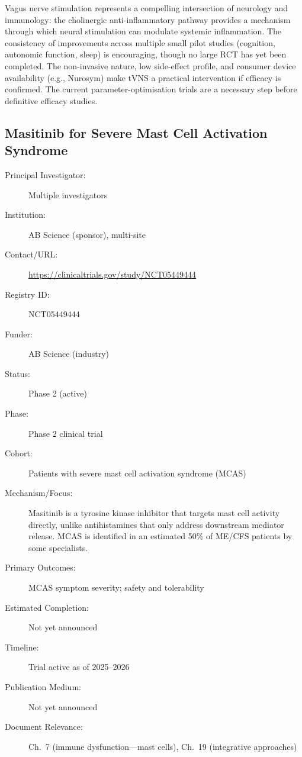 Vagus nerve stimulation represents a compelling intersection of neurology and
immunology: the cholinergic anti-inflammatory pathway provides a mechanism
through which neural stimulation can modulate systemic inflammation.  The
consistency of improvements across multiple small pilot studies (cognition,
autonomic function, sleep) is encouraging, though no large RCT has yet been
completed.  The non-invasive nature, low side-effect profile, and consumer
device availability (e.g., Nurosym) make tVNS a practical intervention if
efficacy is confirmed.  The current parameter-optimisation trials are a
necessary step before definitive efficacy studies.

\subsection{Masitinib for Severe Mast Cell Activation Syndrome}
\label{sec:registry-masitinib}

\begin{description}
    \item[Principal Investigator:] Multiple investigators
    \item[Institution:] AB Science (sponsor), multi-site
    \item[Contact/URL:] \url{https://clinicaltrials.gov/study/NCT05449444}
    \item[Registry ID:] NCT05449444
    \item[Funder:] AB Science (industry)
    \item[Status:] Phase 2 (active)
    \item[Phase:] Phase 2 clinical trial
    \item[Cohort:] Patients with severe mast cell activation syndrome (MCAS)
    \item[Mechanism/Focus:] Masitinib is a tyrosine kinase inhibitor that
        targets mast cell activity directly, unlike antihistamines that only
        address downstream mediator release.  MCAS is identified in an
        estimated 50\% of ME/CFS patients by some specialists.
    \item[Primary Outcomes:] MCAS symptom severity; safety and tolerability
    \item[Estimated Completion:] Not yet announced
    \item[Timeline:] Trial active as of 2025--2026
    \item[Publication Medium:] Not yet announced
    \item[Document Relevance:] Ch.~7 (immune dysfunction---mast cells),
        Ch.~19 (integrative approaches)
\end{description}

